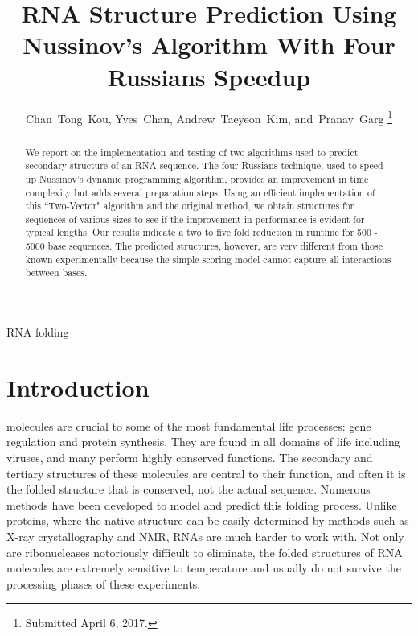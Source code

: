 \documentclass[journal]{IEEEtran}
\author{Chan~Tong~Kou,
Yves~Chan,
Andrew~Taeyeon~Kim,
and~Pranav~Garg%
\thanks{Submitted April 6, 2017.}
}
\title{RNA Structure Prediction Using Nussinov's Algorithm With Four Russians Speedup}
\begin{document}
%
{RNA folding}
\maketitle
\begin{abstract}
We report on the implementation and testing of two algorithms used to predict secondary structure of an RNA sequence. The four Russians technique, used to speed up Nussinov's dynamic programming algorithm, provides an improvement in time complexity but adds several preparation steps. Using an efficient implementation of this ``Two-Vector" algorithm and the original method, we obtain structures for sequences of various sizes to see if the improvement in performance is evident for typical lengths. Our results indicate a two to five fold reduction in runtime for 500 - 5000 base sequences. The predicted structures, however, are very different from those known experimentally because the simple scoring model cannot capture all interactions between bases.
\end{abstract}

\section{Introduction}
 molecules are crucial to some of the most fundamental life processes: gene regulation and protein synthesis. They are found in all domains of life including viruses, and many perform highly conserved functions. The secondary and tertiary structures of these molecules are central to their function, and often it is the folded structure that is conserved, not the actual sequence. Numerous methods have been developed to model and predict this folding process. Unlike proteins, where the native structure can be easily determined by methods such as X-ray crystallography and NMR, RNAs are much harder to work with. Not only are ribonucleases notoriously difficult to eliminate, the folded structures of RNA molecules are extremely sensitive to temperature and usually do not survive the processing phases of these experiments.
\end{document}
